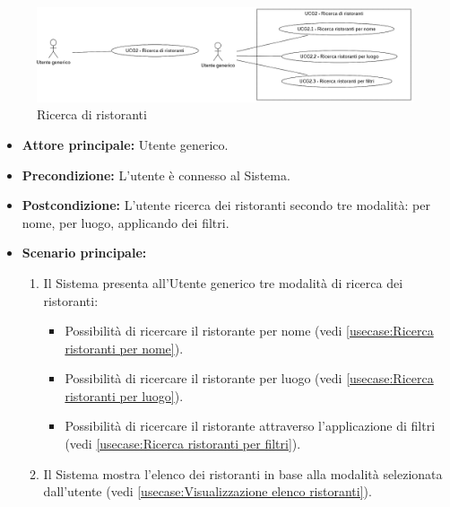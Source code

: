 \newpage
{}
\label{usecase:Ricerca di ristoranti}

\begin{figure}[h]
	\centering
	\includegraphics[width=0.99\textwidth]{./uml/UCG2.png} 
	\caption{Ricerca di ristoranti}
	\label{fig:UCG2}
\end{figure}

\begin{itemize}
	\item \textbf{Attore principale:} Utente generico.

	\item \textbf{Precondizione:}
	      L'utente è connesso al Sistema.

	\item \textbf{Postcondizione:} L'utente ricerca dei ristoranti secondo tre modalità: per nome, per luogo, applicando dei filtri.

	\item \textbf{Scenario principale:}
	      \begin{enumerate}
		      \item Il Sistema presenta all'Utente generico tre modalità di ricerca dei ristoranti:
		            \begin{itemize}
			            \item Possibilità di ricercare il ristorante per nome (vedi \autoref{usecase:Ricerca ristoranti per nome}).
			            \item Possibilità di ricercare il ristorante per luogo (vedi \autoref{usecase:Ricerca ristoranti per luogo}).
			            \item Possibilità di ricercare il ristorante attraverso l'applicazione di filtri (vedi \autoref{usecase:Ricerca ristoranti per filtri}).
		            \end{itemize}

		      \item Il Sistema mostra l'elenco dei ristoranti in base alla modalità selezionata dall'utente (vedi \autoref{usecase:Visualizzazione elenco ristoranti}).

	      \end{enumerate}
\end{itemize}


